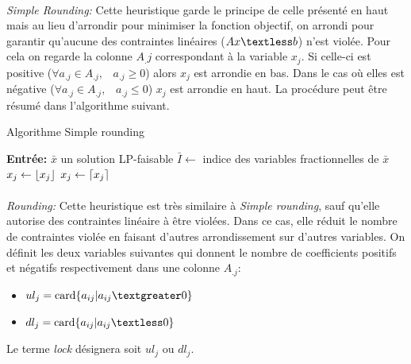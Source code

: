 \documentclass[12pt,a4paper,oneside]{book}
\theoremstyle{definition}
\DeclarePairedDelimiter\ceil{\lceil}{\rceil}
\DeclarePairedDelimiter\floor{\lfloor}{\rfloor}
\begin{document}
	\paragraph{}
	\textit{Simple Rounding:} Cette heuristique garde le principe de celle présenté en haut mais au lieu d'arrondir pour minimiser la fonction objectif, on arrondi pour garantir qu'aucune des contraintes linéaires ($A x \textless b$) n'est violée. Pour cela on regarde la colonne $A_.j$ correspondant à la variable $x_j$. Si celle-ci est positive ($ \forall a_{.j } \in A_{.j}, \hspace{10pt} a_{.j } \geq 0 $) alors $x_j$ est arrondie en bas. Dans le cas où elles est négative ($ \forall a_{.j } \in A_{.j }, \hspace{10pt} a_{.j } \leq 0 $) $x_j$ est arrondie en haut. La procédure peut être résumé dans l'algorithme suivant.
	
	\begin{algorithm}
		\caption{Algorithme Simple rounding}
		\SetAlgoLined
		\DontPrintSemicolon
		\textbf{Entrée:} $\bar{x}$ un solution LP-faisable \;
		$\bar{I} \gets $ indice des variables fractionnelles de $\bar{x}$ \;
		{
			{
				$x_j \gets  \floor{x_j}$ \;  
			}
			{
				$x_j \gets  \ceil{x_j}$ \;  
			}
		}
		
	\end{algorithm}

	\paragraph{}
	\textit{Rounding: } Cette heuristique est très similaire à \textit{Simple rounding}, sauf qu'elle autorise des contraintes linéaire à être violées. Dans ce cas, elle réduit le nombre de contraintes violée en faisant d'autres arrondissement sur d'autres variables.
	On définit les deux variables suivantes qui donnent le nombre de coefficients positifs et négatifs respectivement dans une colonne $A_{.j}$:
	\begin{itemize}
		\item[] $ ul_j = \text{card}\{a_{ij} | a_{ij} \textgreater 0 \} $ 
		
		\item[] $ dl_j = \text{card}\{a_{ij} | a_{ij} \textless 0 \}$
		
	\end{itemize}
	Le terme \textit{lock} désignera soit $ul_j$ ou $dl_j$.
	
\end{document}

